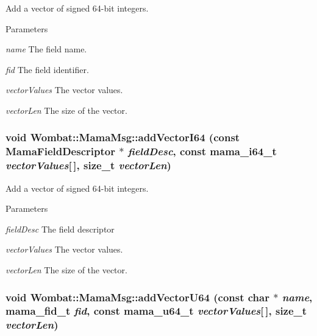 Add a vector of signed 64-\/bit integers. 
\begin{DoxyParams}{Parameters}
\item[{\em name}]The field name. \item[{\em fid}]The field identifier. \item[{\em vectorValues}]The vector values. \item[{\em vectorLen}]The size of the vector. \end{DoxyParams}
\hypertarget{classWombat_1_1MamaMsg_af4be377518eb0c27bb3ca3cb73fb32ac}{
\subsubsection[{addVectorI64}]{\setlength{\rightskip}{0pt plus 5cm}void Wombat::MamaMsg::addVectorI64 (const {\bf MamaFieldDescriptor} $\ast$ {\em fieldDesc}, \/  const mama\_\-i64\_\-t {\em vectorValues}\mbox{[}$\,$\mbox{]}, \/  size\_\-t {\em vectorLen})}}
\label{classWombat_1_1MamaMsg_af4be377518eb0c27bb3ca3cb73fb32ac}


Add a vector of signed 64-\/bit integers. 
\begin{DoxyParams}{Parameters}
\item[{\em fieldDesc}]The field descriptor \item[{\em vectorValues}]The vector values. \item[{\em vectorLen}]The size of the vector. \end{DoxyParams}
\hypertarget{classWombat_1_1MamaMsg_a1cc4ebf37d0be10414dd59cb264e8b79}{
\subsubsection[{addVectorU64}]{\setlength{\rightskip}{0pt plus 5cm}void Wombat::MamaMsg::addVectorU64 (const char $\ast$ {\em name}, \/  mama\_\-fid\_\-t {\em fid}, \/  const mama\_\-u64\_\-t {\em vectorValues}\mbox{[}$\,$\mbox{]}, \/  size\_\-t {\em vectorLen})}}
\label{classWombat_1_1MamaMsg_a1cc4ebf37d0be10414dd59cb264e8b79}


